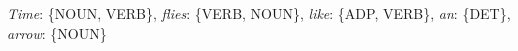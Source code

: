 \textit{Time}: \{NOUN, VERB\}, \textit{flies}: \{VERB, NOUN\}, \textit{like}: \{ADP, VERB\}, \textit{an}: \{DET\}, \textit{arrow}: \{NOUN\}